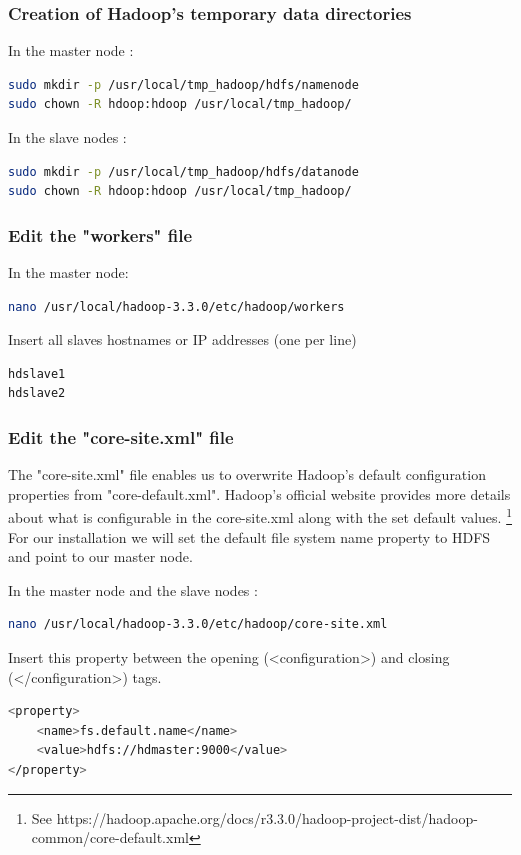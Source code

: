 \documentclass[12pt,english]{book}
\begin{document}
\subsubsection{Creation of Hadoop's temporary data directories}


In the master node :
\begin{lstlisting}[language=bash, frame=single]
sudo mkdir -p /usr/local/tmp_hadoop/hdfs/namenode
sudo chown -R hdoop:hdoop /usr/local/tmp_hadoop/
\end{lstlisting}
In the slave nodes :
\begin{lstlisting}[language=bash, frame=single]
sudo mkdir -p /usr/local/tmp_hadoop/hdfs/datanode
sudo chown -R hdoop:hdoop /usr/local/tmp_hadoop/
\end{lstlisting}


\subsubsection{Edit the "workers" file}


In the master node:
\begin{lstlisting}[language=bash, frame=single]
nano /usr/local/hadoop-3.3.0/etc/hadoop/workers
\end{lstlisting}
Insert all slaves hostnames or IP addresses (one per line)
\begin{lstlisting}[language=bash, frame=single]
hdslave1
hdslave2
\end{lstlisting}


\subsubsection{Edit the "core-site.xml" file}


The "core-site.xml" file enables us to overwrite Hadoop's default configuration properties from "core-default.xml".
Hadoop's official website provides more details about what is configurable in the core-site.xml along with the set default values.
\footnote{See https://hadoop.apache.org/docs/r3.3.0/hadoop-project-dist/hadoop-common/core-default.xml}
For our installation we will set the default file system name property to HDFS and point to our master node.

In the master node and the slave nodes :
\begin{lstlisting}[language=bash, frame=single]
nano /usr/local/hadoop-3.3.0/etc/hadoop/core-site.xml
\end{lstlisting}
Insert this property between the opening (<configuration>) and closing (</configuration>) tags. 
\begin{lstlisting}[language=bash, frame=single]
<property>
	<name>fs.default.name</name>
	<value>hdfs://hdmaster:9000</value>
</property>
\end{lstlisting}
\end{document}
